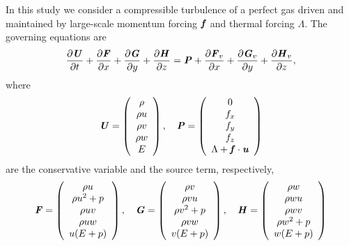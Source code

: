 \documentclass[review]{elsarticle}
\newcommand{\fr}{\frac}
\newcommand{\pF}{\textbf{\emph{F}}}
\newcommand{\pG}{\textbf{\emph{G}}}
\newcommand{\pH}{\textbf{\emph{H}}}
\newcommand{\pP}{\textbf{\emph{P}}}
\newcommand{\pU}{\textbf{\emph{U}}}
\newcommand{\pf}{\textbf{\emph{f}}}
\newcommand{\pu}{\textbf{\emph{u}}}
\newcommand{\pat}{\partial}
\begin{document}
In this study we consider a compressible turbulence of a perfect gas driven and maintained by large-scale momentum forcing $\pf$ and thermal forcing $\Lambda$. The governing equations are
\begin{equation}\label{NS-3d}
  \fr{\pat \pU}{\pat t} + \fr{\pat \pF}{\pat x} + \fr{\pat \pG}{\pat y} + \fr{\pat \pH}{\pat z} = \pP + \fr{\pat \pF_v}{\pat x} + \fr{\pat \pG_v}{\pat y} + \fr{\pat \pH_v}{\pat z},
\end{equation}
where
\begin{equation}
  \pU = \left( \begin{array}{c} \rho \\ \rho u \\ \rho v \\ \rho w \\ E \\ \end{array} \right), \quad
  \pP = \left( \begin{array}{c} 0 \\ f_x \\ f_y \\ f_z \\
  \Lambda + \pf\cdot\pu \\ \end{array} \right)
\end{equation}
are the conservative variable and the source term, respectively,
\begin{equation}
  \pF = \left( \begin{array}{c} \rho u \\ \rho u^2 + p \\ \rho uv \\ \rho uw \\ u (E + p) \\ \end{array} \right), \quad
  \pG = \left( \begin{array}{c} \rho v \\ \rho v u \\ \rho v^2 + p \\ \rho v w \\ v (E + p) \\ \end{array} \right), \quad
  \pH = \left( \begin{array}{c} \rho w \\ \rho wu \\ \rho wv \\ \rho w^2 + p \\ w (E + p) \\ \end{array} \right)
\end{equation}
\end{document}
